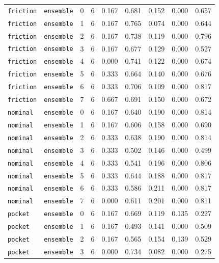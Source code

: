 \documentclass{article}
\begin{document}
\begin{center}
\begin{tabular}{lllcccccc}
\texttt{friction} & \texttt{ensemble} & 0 & 6 & 0.167 & 0.681 & 0.152 & 0.000 & 0.657 \\
\texttt{friction} & \texttt{ensemble} & 1 & 6 & 0.167 & 0.765 & 0.074 & 0.000 & 0.644 \\
\texttt{friction} & \texttt{ensemble} & 2 & 6 & 0.167 & 0.738 & 0.119 & 0.000 & 0.796 \\
\texttt{friction} & \texttt{ensemble} & 3 & 6 & 0.167 & 0.677 & 0.129 & 0.000 & 0.527 \\
\texttt{friction} & \texttt{ensemble} & 4 & 6 & 0.000 & 0.741 & 0.122 & 0.000 & 0.674 \\
\texttt{friction} & \texttt{ensemble} & 5 & 6 & 0.333 & 0.664 & 0.140 & 0.000 & 0.676 \\
\texttt{friction} & \texttt{ensemble} & 6 & 6 & 0.333 & 0.706 & 0.109 & 0.000 & 0.817 \\
\texttt{friction} & \texttt{ensemble} & 7 & 6 & 0.667 & 0.691 & 0.150 & 0.000 & 0.672 \\
\texttt{nominal} & \texttt{ensemble} & 0 & 6 & 0.167 & 0.640 & 0.190 & 0.000 & 0.814 \\
\texttt{nominal} & \texttt{ensemble} & 1 & 6 & 0.167 & 0.606 & 0.158 & 0.000 & 0.690 \\
\texttt{nominal} & \texttt{ensemble} & 2 & 6 & 0.333 & 0.638 & 0.190 & 0.000 & 0.814 \\
\texttt{nominal} & \texttt{ensemble} & 3 & 6 & 0.333 & 0.502 & 0.146 & 0.000 & 0.499 \\
\texttt{nominal} & \texttt{ensemble} & 4 & 6 & 0.333 & 0.541 & 0.196 & 0.000 & 0.806 \\
\texttt{nominal} & \texttt{ensemble} & 5 & 6 & 0.333 & 0.644 & 0.188 & 0.000 & 0.817 \\
\texttt{nominal} & \texttt{ensemble} & 6 & 6 & 0.333 & 0.586 & 0.211 & 0.000 & 0.817 \\
\texttt{nominal} & \texttt{ensemble} & 7 & 6 & 0.000 & 0.611 & 0.201 & 0.000 & 0.811 \\
\texttt{pocket} & \texttt{ensemble} & 0 & 6 & 0.167 & 0.669 & 0.119 & 0.135 & 0.227 \\
\texttt{pocket} & \texttt{ensemble} & 1 & 6 & 0.167 & 0.493 & 0.141 & 0.000 & 0.509 \\
\texttt{pocket} & \texttt{ensemble} & 2 & 6 & 0.167 & 0.565 & 0.154 & 0.139 & 0.529 \\
\texttt{pocket} & \texttt{ensemble} & 3 & 6 & 0.000 & 0.734 & 0.082 & 0.000 & 0.275 \\
\bottomrule
\end{tabular}
\end{center}
\end{document}
